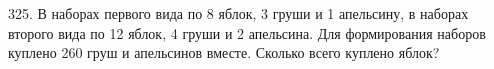 325. В наборах первого вида по 8 яблок, 3 груши и 1 апельсину, в наборах второго вида по 12 яблок, 4 груши и 2 апельсина. Для формирования наборов куплено
260 груш и апельсинов вместе. Сколько всего куплено яблок?\\
